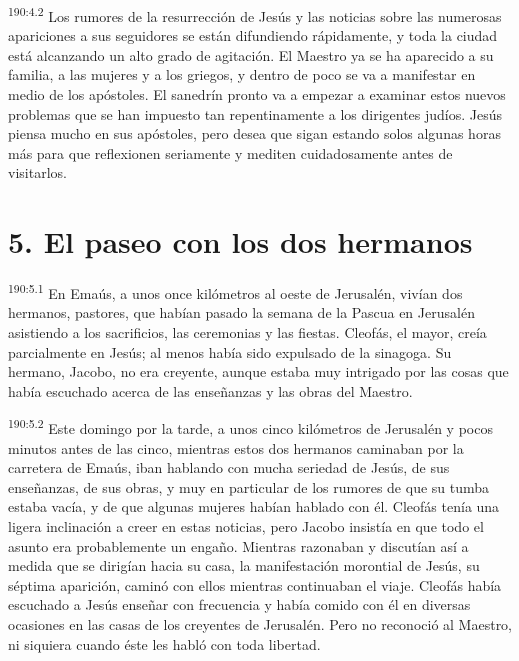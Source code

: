 \par 
\textsuperscript{190:4.2} Los rumores de la resurrección de Jesús y las noticias sobre las numerosas apariciones a sus seguidores se están difundiendo rápidamente, y toda la ciudad está alcanzando un alto grado de agitación. El Maestro ya se ha aparecido a su familia, a las mujeres y a los griegos, y dentro de poco se va a manifestar en medio de los apóstoles. El sanedrín pronto va a empezar a examinar estos nuevos problemas que se han impuesto tan repentinamente a los dirigentes judíos. Jesús piensa mucho en sus apóstoles, pero desea que sigan estando solos algunas horas más para que reflexionen seriamente y mediten cuidadosamente antes de visitarlos.

\section*{5. El paseo con los dos hermanos}
\par 
\textsuperscript{190:5.1} En Emaús, a unos once kilómetros al oeste de Jerusalén, vivían dos hermanos, pastores, que habían pasado la semana de la Pascua en Jerusalén asistiendo a los sacrificios, las ceremonias y las fiestas. Cleofás, el mayor, creía parcialmente en Jesús; al menos había sido expulsado de la sinagoga. Su hermano, Jacobo, no era creyente, aunque estaba muy intrigado por las cosas que había escuchado acerca de las enseñanzas y las obras del Maestro.

\par 
\textsuperscript{190:5.2} Este domingo por la tarde, a unos cinco kilómetros de Jerusalén y pocos minutos antes de las cinco, mientras estos dos hermanos caminaban por la carretera de Emaús, iban hablando con mucha seriedad de Jesús, de sus enseñanzas, de sus obras, y muy en particular de los rumores de que su tumba estaba vacía, y de que algunas mujeres habían hablado con él. Cleofás tenía una ligera inclinación a creer en estas noticias, pero Jacobo insistía en que todo el asunto era probablemente un engaño. Mientras razonaban y discutían así a medida que se dirigían hacia su casa, la manifestación morontial de Jesús, su séptima aparición, caminó con ellos mientras continuaban el viaje. Cleofás había escuchado a Jesús enseñar con frecuencia y había comido con él en diversas ocasiones en las casas de los creyentes de Jerusalén. Pero no reconoció al Maestro, ni siquiera cuando éste les habló con toda libertad.


